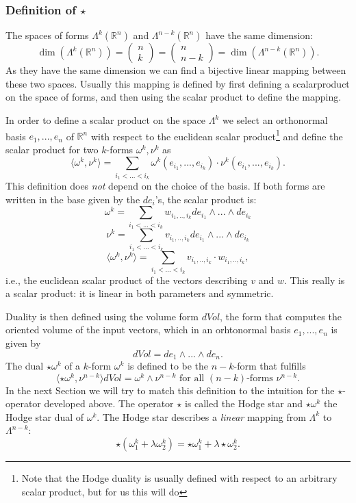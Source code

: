 \subsubsection{Definition of $\star$}
The spaces of forms $\Lambda^k(\mathbb R^n)$ and $\Lambda^{n-k}(\mathbb R^n)$ have the same dimension:
\[\dim(\Lambda^k(\mathbb R^n)) = \begin{pmatrix}
n \\ k
\end{pmatrix}= \begin{pmatrix}
n \\ n-k
\end{pmatrix} = \dim(\Lambda^{n-k}(\mathbb R^n)).\]
As they have the same dimension we can find a bijective linear mapping between these two spaces. Usually this mapping is defined by first defining  a scalarproduct on the space of forms, and then using the scalar product to define the mapping. 

In order to define a scalar product on the space $\Lambda^k$ we select an orthonormal basis $e_1,...,e_n$ of $\mathbb R^n$ with respect to the euclidean scalar product\footnote{Note that the Hodge duality is usually defined with respect to an arbitrary scalar product, but for us this will do} and define the scalar product for two $k$-forms $\omega^k, \nu^k$ as
\[\langle \omega^k, \nu^k \rangle = \sum_{i_1 <...<i_k} \omega^k(e_{i_1},...,e_{i_k})\cdot \nu^k(e_{i_1},...,e_{i_k}).\]
This definition does \emph{not} depend on the choice of the basis. If both forms are written in the base given by the $de_i$'s, the scalar product is:
\[\omega^k = \sum_{i_1<...<i_k}w_{i_1,..,i_k} de_{i_1}\wedge ...\wedge de_{i_k}\]
\[\nu^k = \sum_{i_1<...<i_k}v_{i_1,..,i_k} de_{i_1}\wedge ...\wedge de_{i_k}\]
\[\langle \omega^k, \nu^k\rangle = \sum_{i_1<...<i_k} v_{i_1,..,i_k} \cdot w_{i_1,..,i_k},\]
i.e., the euclidean scalar product of the vectors describing $v$ and $w$. This really is a scalar product: it is linear in both parameters and symmetric.

Duality is then defined using the volume form $dVol$, the form that computes the oriented volume of the input vectors, which in an orhtonormal basis $e_1,...,e_n$ is given by
\[dVol = de_1 \wedge ... \wedge de_n.\]
 The dual $\star\omega^k$ of a $k$-form $\omega^k$ is defined to be the $n-k$-form that fulfills
\begin{equation}\langle\star\omega^k, \nu^{n-k}\rangle dVol  = \omega^k \wedge \nu^{n-k} \text{ for all $(n-k)$-forms $\nu^{n-k}$}.\label{eq:4_def_star}\end{equation}
In the next Section we will try to match this definition to the intuition for the $\star$-operator developed above.  
The operator $\star$ is called the Hodge star and $\star \omega^k$ the Hodge star dual of $\omega^k$. The Hodge star describes a \emph{linear} mapping from $\Lambda^k$ to $\Lambda^{n-k}$:
 \begin{equation}\star(\omega_1^k + \lambda \omega_2^k) = \star\omega_1^k + \lambda \star\omega_2^k .\label{eq:4_star_linearity}\end{equation}

